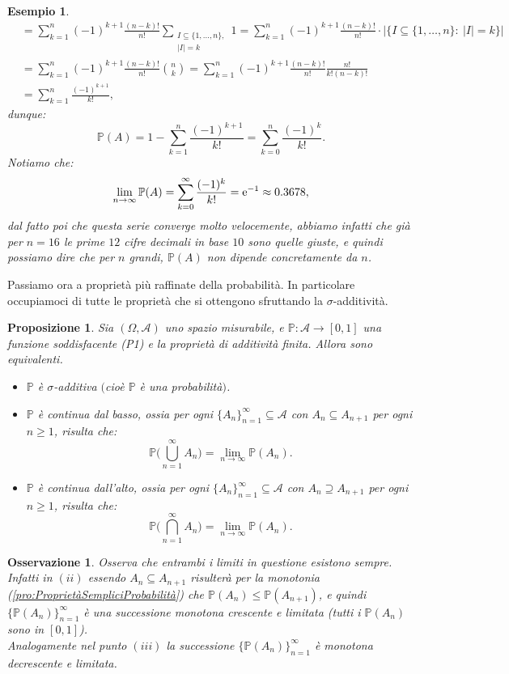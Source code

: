 \documentclass[11pt]{book}
\theoremstyle{Definizione}
\theoremstyle{TeoremaProposizioneLemmaCorollario}
\newtheorem{mypropo}[myteo]{Proposizione}
\theoremstyle{OsservazioneNota}
\newtheorem{myobs}{Osservazione}[section]
\newtheorem{myes}{Esempio}[section]
\renewcommand{\P}{\mathbb{P}}
\newcommand{\e}{\textup{e}}
\begin{document}
\begin{myes}
\begin{align*}
&= \sum_{k = 1}^{n} (-1)^{k+1} \frac{(n-k)!}{n!}\sum_{\substack{ I \subseteq \{1,\dots,n\},\\ |I| = k}} 1 = \sum_{k = 1}^n (-1)^{k+1} \frac{(n-k)!}{n!} \cdot |\{I\subseteq \{1,\dots,n\}:\ |I| = k\}| \\ &= \sum_{k = 1}^{n} (-1)^{k+1} \frac{(n-k)!}{n!}\binom{n}{k} = \sum_{k = 1}^{n} (-1)^{k+1} \frac{(n-k)!}{n!}\frac{n!}{k!(n-k)!} \\
&= \sum_{k = 1}^n \frac{(-1)^{k+1}}{k!},
\end{align*}
dunque:
$$
\P(A) = 1- \sum_{k = 1}^n \frac{(-1)^{k+1}}{k!} = \sum_{k = 0}^n \frac{(-1)^k}{k!}.
$$
Notiamo che:
$$
\lim_{n \to \infty} \P(A) = \sum_{k = 0}^\infty \frac{(-1)^k}{k!} = \e^{-1} \approx 0.3678,
$$
dal fatto poi che questa serie converge molto velocemente, abbiamo infatti che già per $n = 16$ le prime $12$ cifre decimali in base $10$ sono quelle giuste, e quindi possiamo dire che per $n$ grandi, $\P(A)$ non dipende concretamente da $n$.
\end{myes}
Passiamo ora a proprietà più raffinate della probabilità. In particolare occupiamoci di tutte le proprietà che si ottengono sfruttando la $\sigma$-additività.
\begin{boxpro}
\begin{mypropo}
Sia $(\Omega,\mathcal{A})$ uno spazio misurabile, e $\P:\mathcal{A}\longrightarrow [0,1]$ una funzione soddisfacente \textup{(P1)} e la proprietà di additività finita. Allora sono equivalenti.
\begin{itemize}
\item[$(i)$] $\P$ è $\sigma$-additiva $($cioè $\P$ è una probabilità$)$.
\item[$(ii)$] $\P$ è continua dal basso, ossia per ogni $\{A_n\}_{n = 1}^\infty \subseteq \mathcal{A}$ con $A_n \subseteq A_{n+1}$ per ogni $n\geq 1$, risulta che:
$$
\P\Bigg(\bigcup_{n = 1}^\infty A_n\Bigg) = \lim_{n \to \infty} \P(A_n).
$$
\item[$(iii)$] $\P$ è continua dall'alto, ossia per ogni $\{A_n\}_{n = 1}^\infty\subseteq \mathcal{A}$ con $A_n \supseteq A_{n+1}$ per ogni $n\geq 1$, risulta che:
$$
\P\Bigg(\bigcap_{n = 1}^\infty A_n\Bigg) = \lim_{n \to \infty} \P(A_n).
$$
\end{itemize}
\end{mypropo}
\end{boxpro}
\begin{myobs}
Osserva che entrambi i limiti in questione esistono sempre. Infatti in $(ii)$ essendo $A_n \subseteq A_{n+1}$ risulterà per la monotonia (\ref{pro:ProprietàSempliciProbabilità}) che $\P(A_n) \leq \P(A_{n+1})$, e quindi $\{\P(A_n)\}_{n = 1}^\infty$ è una successione monotona crescente e limitata (tutti i $\P(A_n)$ sono in $[0,1]$).\\
Analogamente nel punto $(iii)$ la successione $\{\P(A_n)\}_{n = 1}^\infty$ è monotona decrescente e limitata.
\end{myobs}
\end{document}
